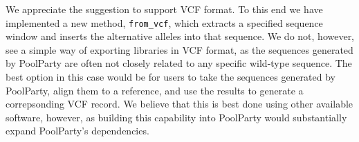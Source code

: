 \documentclass[11pt]{article}
\newenvironment{response}{\par\color{responseblue}}{\par}
\begin{document}
\begin{enumerate}
\begin{response}
We appreciate the suggestion to support VCF format. To this end we have implemented a new method, \texttt{from\_vcf}, which extracts a specified sequence window and inserts the alternative alleles into that sequence. We do not, however, see a simple way of exporting libraries in VCF format, as the sequences generated by PoolParty are often not closely related to any specific wild-type sequence. The best option in this case would be for users to take the sequences generated by PoolParty, align them to a reference, and use the results to generate a correpsonding VCF record. We believe that this is best done using other available software, however, as building this capability into PoolParty would substantially expand PoolParty's dependencies.
\end{response}





\end{enumerate}
\end{document}
